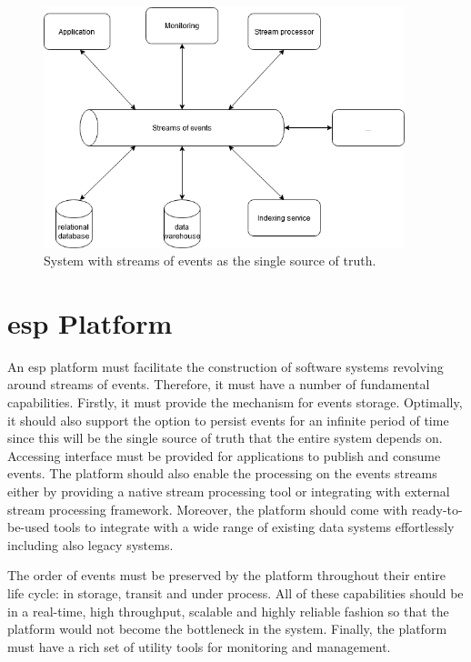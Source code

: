 \begin{figure}[h]
	\includegraphics[width=\linewidth,height=7cm]{images/eventstreamprocessing.png}
	\caption{System with streams of events as the single source of truth.}
	\label{fig:eventstreamprocessingsystem}
\end{figure}

\section{\acrlong{esp} Platform}
An \acrshort{esp} platform must facilitate the construction of software systems revolving around streams of events. Therefore, it must have a number of fundamental capabilities. Firstly, it must provide the mechanism for events storage. Optimally, it should also support the option to persist events for an infinite period of time since this will be the single source of truth that the entire system depends on. Accessing interface must be provided for applications to publish and consume events. The platform should also enable the processing on the events streams either by providing a native stream processing tool or integrating with external stream processing framework. Moreover, the platform should come with ready-to-be-used tools to integrate with a wide range of existing data systems effortlessly including also legacy systems.

The order of events must be preserved by the platform throughout their entire life cycle: in storage, transit and under process. All of these capabilities should be in a real-time, high throughput, scalable and highly reliable fashion so that the platform would not become the bottleneck in the system. Finally, the platform must have a rich set of utility tools for monitoring and management.



